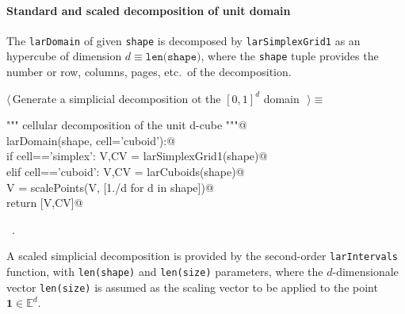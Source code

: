 \documentclass[11pt,oneside]{article}	%
\def\E{\mathbb{E}}
\begin{document}
\paragraph{Standard and scaled decomposition of unit domain}
The \texttt{larDomain} of given \texttt{shape} is decomposed by \texttt{larSimplexGrid1} as an hypercube of dimension $d \equiv\texttt{len(shape)}$, where the \texttt{shape} tuple provides the number or row, columns, pages, etc.~of the decomposition.

\begin{flushleft} \small \label{scrap1}
$\langle\,$Generate a simplicial decomposition ot the $[0,1]^d$ domain\nobreak\ {\footnotesize {}}$\,\rangle\equiv$
\vspace{-1ex}
\begin{list}{}{} \item
\mbox{}\verb@""" cellular decomposition of the unit d-cube """@\\
\mbox{}\verb@def larDomain(shape, cell='cuboid'):@\\
\mbox{}\verb@   if cell=='simplex': V,CV = larSimplexGrid1(shape)@\\
\mbox{}\verb@   elif cell=='cuboid': V,CV = larCuboids(shape)@\\
\mbox{}\verb@   V = scalePoints(V, [1./d for d in shape])@\\
\mbox{}\verb@   return [V,CV]@\\
\mbox{}\verb@@{\NWsep}
\end{list}
\vspace{-1ex}
\footnotesize\addtolength{\baselineskip}{-1ex}
\begin{list}{}{\setlength{\itemsep}{-\parsep}\setlength{\itemindent}{-\leftmargin}}
\item \NWtxtMacroRefIn\ .
\end{list}
\end{flushleft}

A scaled simplicial decomposition is provided by the second-order  \texttt{larIntervals} function, with \texttt{len(shape)} and \texttt{len(size)} parameters, where the $d$-dimensionale vector \texttt{len(size)} is assumed as the scaling vector to be applied to the point $\mathbf{1}\in\E^d$.
\end{document}
